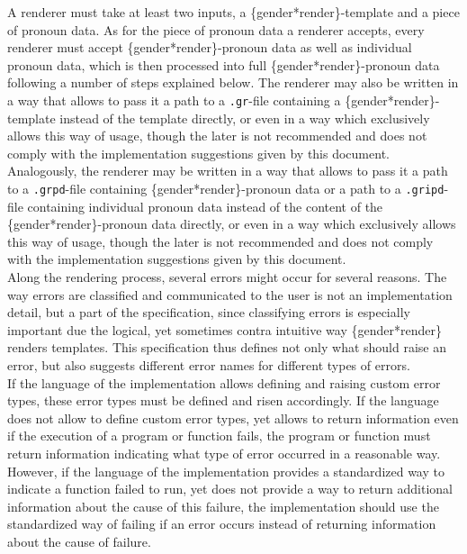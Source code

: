 \documentclass{article}
\begin{document}
    A renderer must take at least two inputs, a \{gender*render\}-template and a piece of pronoun data.
    As for the piece of pronoun data a renderer accepts, every renderer must accept \{gender*render\}-pronoun data as well as individual pronoun data, which is then processed into full \{gender*render\}-pronoun data following a number of steps explained below.
    The renderer may also be written in a way that allows to pass it a path to a \texttt{.gr}-file containing a \{gender*render\}-template instead of the template directly, or even in a way which exclusively allows this way of usage, though the later is not recommended and does not comply with the implementation suggestions given by this document.
    Analogously, the renderer may be written in a way that allows to pass it a path to a \texttt{.grpd}-file containing \{gender*render\}-pronoun data or a path to a \texttt{.gripd}-file containing individual pronoun data instead of the content of the \{gender*render\}-pronoun data directly, or even in a way which exclusively allows this way of usage, though the later is not recommended and does not comply with the implementation suggestions given by this document.\\

    Along the rendering process, several errors might occur for several reasons.
    The way errors are classified and communicated to the user is not an implementation detail, but a part of the specification, since classifying errors is especially important due the logical, yet sometimes contra intuitive way \{gender*render\} renders templates.
    This specification thus defines not only what should raise an error, but also suggests different error names for different types of errors.\\

    If the language of the implementation allows defining and raising custom error types, these error types must be defined and risen accordingly.
    If the language does not allow to define custom error types, yet allows to return information even if the execution of a program or function fails, the program or function must return information indicating what type of error occurred in a reasonable way.
    However, if the language of the implementation provides a standardized way to indicate a function failed to run, yet does not provide a way to return additional information about the cause of this failure, the implementation should use the standardized way of failing if an error occurs instead of returning information about the cause of failure.\\
\end{document}
